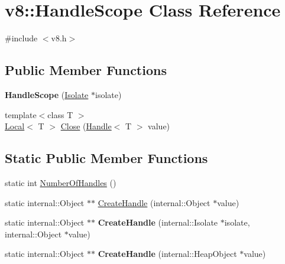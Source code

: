 \hypertarget{classv8_1_1_handle_scope}{}\section{v8\+:\+:Handle\+Scope Class Reference}
\label{classv8_1_1_handle_scope}


{\ttfamily \#include $<$v8.\+h$>$}

\subsection*{Public Member Functions}
\begin{DoxyCompactItemize}
\item 
\hypertarget{classv8_1_1_handle_scope_afdb3053d852ea467f026b025ed431e79}{}{\bfseries Handle\+Scope} (\hyperlink{classv8_1_1_isolate}{Isolate} $\ast$isolate)\label{classv8_1_1_handle_scope_afdb3053d852ea467f026b025ed431e79}

\item 
{\footnotesize template$<$class T $>$ }\\\hyperlink{classv8_1_1_local}{Local}$<$ T $>$ \hyperlink{classv8_1_1_handle_scope_af18b68b6b149e69a05873a20c6fa269c}{Close} (\hyperlink{classv8_1_1_handle}{Handle}$<$ T $>$ value)
\end{DoxyCompactItemize}
\subsection*{Static Public Member Functions}
\begin{DoxyCompactItemize}
\item 
static int \hyperlink{classv8_1_1_handle_scope_abb2d32a75b0468885b7340404050604b}{Number\+Of\+Handles} ()
\item 
static internal\+::\+Object $\ast$$\ast$ \hyperlink{classv8_1_1_handle_scope_a93131ee7939a9bc52a62a1f370882906}{Create\+Handle} (internal\+::\+Object $\ast$value)
\item 
\hypertarget{classv8_1_1_handle_scope_a3f63aa8552a0371606305f58187d80e2}{}static internal\+::\+Object $\ast$$\ast$ {\bfseries Create\+Handle} (internal\+::\+Isolate $\ast$isolate, internal\+::\+Object $\ast$value)\label{classv8_1_1_handle_scope_a3f63aa8552a0371606305f58187d80e2}

\item 
\hypertarget{classv8_1_1_handle_scope_a3c74ab114761127941531ec4ebb9952b}{}static internal\+::\+Object $\ast$$\ast$ {\bfseries Create\+Handle} (internal\+::\+Heap\+Object $\ast$value)\label{classv8_1_1_handle_scope_a3c74ab114761127941531ec4ebb9952b}

\end{DoxyCompactItemize}
